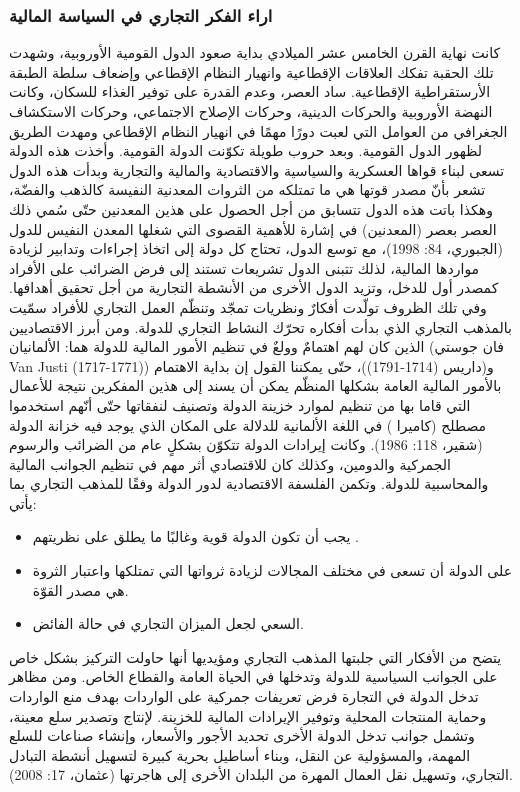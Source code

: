 \documentclass[10pt,a4paper]{report}
\begin{document}
\begin{doublespacing}
\subsubsection{اراء الفكر التجاري في السياسة المالية}
كانت نهاية القرن الخامس عشر الميلادي بداية صعود الدول القومية الأوروبية، وشهدت تلك الحقبة تفكك العلاقات الإقطاعية وانهيار النظام الإقطاعي وإضعاف سلطة الطبقة الأرستقراطية الإقطاعية. ساد العصر، وعدم القدرة على توفير الغذاء للسكان، وكانت النهضة الأوروبية والحركات الدينية، وحركات الإصلاح الاجتماعي، وحركات الاستكشاف الجغرافي من العوامل التي لعبت دورًا مهمًا في انهيار النظام الإقطاعي ومهدت الطريق لظهور الدول القومية.
وبعد حروب طويلة تكوّنت الدولة القومية. وأخذت هذه الدولة تسعى لبناء قواها العسكرية والسياسية والاقتصادية والمالية والتجارية وبدأت هذه الدول تشعر بأنّ مصدر قوتها هي ما تمتلكه من الثروات المعدنية النفيسة كالذهب والفضّة، وهكذا باتت هذه الدول تتسابق من أجل الحصول على هذين المعدنين حتّى سُمي ذلك العصر بعصر (المعدنين) في إشارة للأهمية القصوى التي شغلها المعدن النفيس للدول {(الجبوري، 84: 1998)}، مع توسع الدول، تحتاج كل دولة إلى اتخاذ إجراءات وتدابير لزيادة مواردها المالية، لذلك تتبنى الدول تشريعات تستند إلى فرض الضرائب على الأفراد كمصدر أول للدخل، وتزيد الدول الأخرى من الأنشطة التجارية من أجل تحقيق أهدافها.
وفي تلك الظروف تولّدت أفكارٌ ونظريات تمجّد وتنظّم العمل التجاري للأفراد سمّيت بالمذهب التجاري  الذي بدأت أفكاره تحرّك النشاط التجاري للدولة.
ومن أبرز الاقتصاديين الذين كان لهم اهتمامٌ وولعٌ في تنظيم الأمور المالية للدولة هما: الألمانيان {(فان جوستي Van Justi (1717-1771))} و{(داريس  (1714-1791))}، حتّى يمكننا القول إن بداية الاهتمام بالأمور المالية العامة بشكلها المنظّم يمكن أن يسند إلى هذين المفكرين نتيجة للأعمال التي قاما بها من تنظيم لموارد خزينة الدولة وتصنيف لنفقاتها حتّى أنّهم استخدموا مصطلح {(كاميرا )} في اللغة الألمانية للدلالة على المكان الذي يوجد فيه خزانة الدولة {(شقير، 118: 1986)}. وكانت إيرادات الدولة تتكوّن بشكلٍ عام من الضرائب والرسوم الجمركية والدومين، وكذلك كان للاقتصادي  أثر مهم في تنظيم الجوانب المالية والمحاسبية للدولة. وتكمن الفلسفة الاقتصادية لدور الدولة وفقًا للمذهب التجاري بما يأتي:
\begin{itemize}
	\item يجب أن تكون الدولة قوية وغالبًا ما يطلق على نظريتهم .
	\item على الدولة أن تسعى في مختلف المجالات لزيادة ثرواتها التي تمتلكها واعتبار الثروة هي مصدر القوّة.
	\item السعي لجعل الميزان التجاري في حالة الفائض.
\end{itemize}
يتضح من الأفكار التي جلبتها المذهب التجاري ومؤيديها أنها حاولت التركيز بشكل خاص على الجوانب السياسية للدولة وتدخلها في الحياة العامة والقطاع الخاص.
ومن مظاهر تدخل الدولة في التجارة فرض تعريفات جمركية على الواردات بهدف منع الواردات وحماية المنتجات المحلية وتوفير الإيرادات المالية للخزينة. لإنتاج وتصدير سلع معينة، وتشمل جوانب تدخل الدولة الأخرى تحديد الأجور والأسعار، وإنشاء صناعات للسلع المهمة، والمسؤولية عن النقل، وبناء أساطيل بحرية كبيرة لتسهيل أنشطة التبادل التجاري، وتسهيل نقل العمال المهرة من البلدان الأخرى إلى هاجرتها {(عثمان، 17: 2008)}.

\end{doublespacing}
\end{document}
